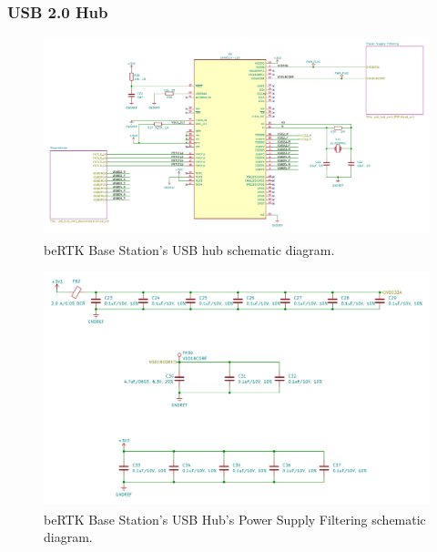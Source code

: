 
\subsubsection{USB 2.0 Hub}\label{sec:3234_LAN9514}



\begin{figure}[h]
	\centering
	\includegraphics[width=1.0\textwidth]{Chapters/Figures/chapter3/USB_Hub_1.pdf}
	\caption{beRTK\textsuperscript{\textregistered} Base Station's USB hub schematic diagram.}
	\label{fig:USB_Hub_1_circuit}
\end{figure}

\begin{figure}[h]
	\centering
	\includegraphics[width=1.0\textwidth]{Chapters/Figures/chapter3/USB_Hub_PwrSplyFiltering.pdf}
	\caption{beRTK\textsuperscript{\textregistered} Base Station's USB Hub's Power Supply Filtering schematic diagram.}
	\label{fig:USB_Hub_PwrSplyFiltering_circuit}
\end{figure}

